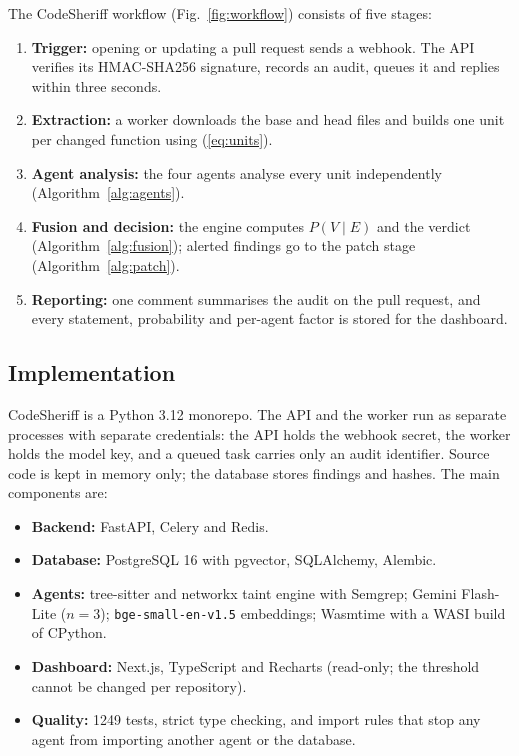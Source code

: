 \documentclass[conference]{IEEEtran}
\begin{document}
The CodeSheriff workflow (Fig.~\ref{fig:workflow}) consists of five
stages:
\begin{enumerate}
\item \textbf{Trigger:} opening or updating a pull request sends a webhook.
The API verifies its HMAC-SHA256 signature, records an audit, queues it and
replies within three seconds.
\item \textbf{Extraction:} a worker downloads the base and head files and
builds one unit per changed function using (\ref{eq:units}).
\item \textbf{Agent analysis:} the four agents analyse every unit
independently (Algorithm~\ref{alg:agents}).
\item \textbf{Fusion and decision:} the engine computes $P(V\mid E)$ and
the verdict (Algorithm~\ref{alg:fusion}); alerted findings go to the
patch stage (Algorithm~\ref{alg:patch}).
\item \textbf{Reporting:} one comment summarises the audit on the pull
request, and every statement, probability and per-agent factor is stored
for the dashboard.
\end{enumerate}

\subsection{Implementation}

CodeSheriff is a Python 3.12 monorepo. The API and the worker run as
separate processes with separate credentials: the API holds the webhook
secret, the worker holds the model key, and a queued task carries only an
audit identifier. Source code is kept in memory only; the database stores
findings and hashes. The main components are:
\begin{itemize}
\item \textbf{Backend:} FastAPI, Celery and Redis.
\item \textbf{Database:} PostgreSQL 16 with pgvector, SQLAlchemy, Alembic.
\item \textbf{Agents:} tree-sitter and networkx taint engine with Semgrep;
Gemini Flash-Lite ($n=3$); \texttt{bge-small-en-v1.5} embeddings;
Wasmtime with a WASI build of CPython.
\item \textbf{Dashboard:} Next.js, TypeScript and Recharts (read-only; the
threshold cannot be changed per repository).
\item \textbf{Quality:} 1249 tests, strict type checking, and import rules
that stop any agent from importing another agent or the database.
\end{itemize}
\end{document}
